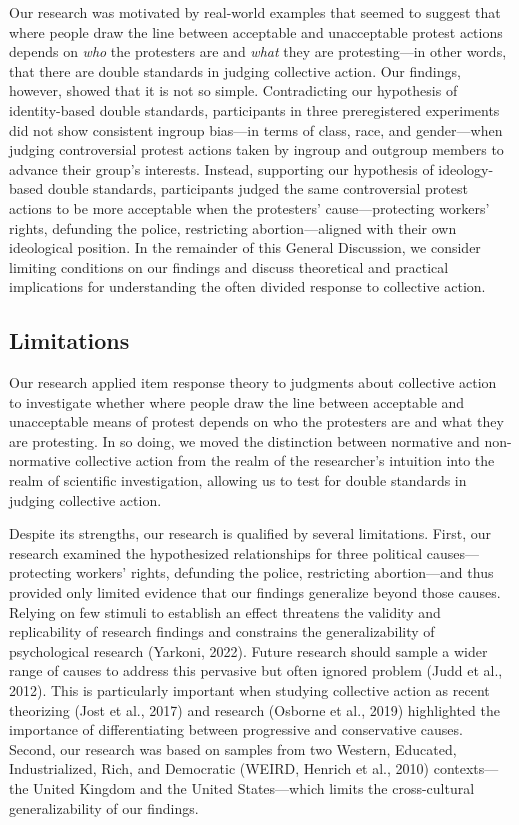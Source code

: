 \documentclass[12pt, letterpaper]{article}
\begin{document}
Our research was motivated by real-world examples that seemed to suggest
that where people draw the line between acceptable and unacceptable
protest actions depends on \emph{who} the protesters are and \emph{what}
they are protesting---in other words, that there are double standards in
judging collective action. Our findings, however, showed that it is not
so simple. Contradicting our hypothesis of identity-based double
standards, participants in three preregistered experiments did not show
consistent ingroup bias---in terms of class, race, and gender---when
judging controversial protest actions taken by ingroup and outgroup
members to advance their group's interests. Instead, supporting our
hypothesis of ideology-based double standards, participants judged the
same controversial protest actions to be more acceptable when the
protesters' cause---protecting workers' rights, defunding the police,
restricting abortion---aligned with their own ideological position. In
the remainder of this General Discussion, we consider limiting
conditions on our findings and discuss theoretical and practical
implications for understanding the often divided response to collective
action.

\hypertarget{limitations}{%
\subsection{Limitations}\label{limitations}}

Our research applied item response theory to judgments about collective
action to investigate whether where people draw the line between
acceptable and unacceptable means of protest depends on who the
protesters are and what they are protesting. In so doing, we moved the
distinction between normative and non-normative collective action from
the realm of the researcher's intuition into the realm of scientific
investigation, allowing us to test for double standards in judging
collective action.

Despite its strengths, our research is qualified by several limitations.
First, our research examined the hypothesized relationships for three
political causes---protecting workers' rights, defunding the police,
restricting abortion---and thus provided only limited evidence that our
findings generalize beyond those causes. Relying on few stimuli to
establish an effect threatens the validity and replicability of research
findings and constrains the generalizability of psychological research
(Yarkoni, 2022). Future research should sample a wider range of causes
to address this pervasive but often ignored problem (Judd et al., 2012).
This is particularly important when studying collective action as recent
theorizing (Jost et al., 2017) and research (Osborne et al., 2019)
highlighted the importance of differentiating between progressive and
conservative causes. Second, our research was based on samples from two
Western, Educated, Industrialized, Rich, and Democratic (WEIRD, Henrich
et al., 2010) contexts---the United Kingdom and the United
States---which limits the cross-cultural generalizability of our
findings.
\end{document}
